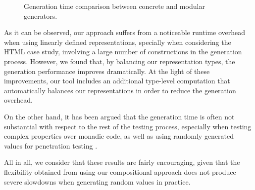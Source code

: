 \begin{figure}[b]
  \vspace{-10pt}
  \centering
  \vspace{-7pt}
  \caption{Generation time comparison between concrete and modular generators.}
  \label{fig:times}
  \vspace{-5pt}
\end{figure}

As it can be observed, our approach suffers from a noticeable runtime overhead
when using linearly defined representations, specially when considering the HTML
case study, involving a large number of constructions in the generation process.
%
However, we found that, by balancing our representation types, the generation
performance improves dramatically.
%
At the light of these improvements, our tool includes an additional type-level
computation that automatically balances our representations in order to reduce
the generation overhead.


On the other hand, it has been argued that the generation time is often not
substantial with respect to the rest of the testing process, especially when
testing complex properties over monadic code, as well as using randomly
generated values for penetration testing
\cite{DBLP:conf/haskell/MistaRH18,grieco2017}.


All in all, we consider that these results are fairly encouraging, given that
the flexibility obtained from using our compositional approach does not produce
severe slowdowns when generating random values in practice.

